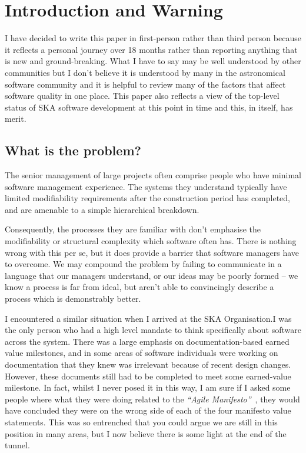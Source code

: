 \documentclass[11pt,twoside]{article}
\begin{document}
\section{Introduction and Warning} %
\label{sec:introduction_and_warning}

I have decided to write this paper in first-person rather than third person because it reflects a personal journey over 18 months rather than reporting anything that is new and ground-breaking. What I have to say may be well understood by other communities but I don't believe it is understood by many in the astronomical software community and it is helpful to review many of the factors that affect software quality in one place. This paper also reflects a view of the top-level status of SKA software development at this point in time and this, in itself, has merit.

\subsection{What is the problem?} %
\label{sub:what_is_the_problem}
The senior management of large projects often comprise people who have minimal software management experience. The systems they understand typically have limited modifiability requirements after the construction period has completed, and are amenable to a simple hierarchical breakdown. 

Consequently, the processes they are familiar with don't emphasise the modifiability or structural complexity which software often has. There is nothing wrong with this per se, but it does provide a barrier that software managers have to overcome. We may compound the problem by failing to communicate in a language that our managers understand, or our ideas may be poorly formed -- we know a process is far from ideal, but aren't able to convincingly describe a process which is demonstrably better.

I encountered a similar situation when I arrived at the SKA Organisation.I was the only person who had a high level mandate to think specifically about software across the system. There was a large emphasis on documentation-based earned value milestones, and in some areas of software individuals were working on documentation that they knew was irrelevant because of recent design changes. However, these documents still had to be completed to meet some earned-value milestone. In fact, whilst I never posed it in this way, I am sure if I asked some people where what they were doing related to the \emph{``Agile Manifesto''}~\citep{agile2001}, they would have concluded they were on the wrong side of each of the four manifesto value statements. This was so entrenched that you could argue we are still in this position in many areas, but I now believe there is some light at the end of the tunnel.
\end{document}
